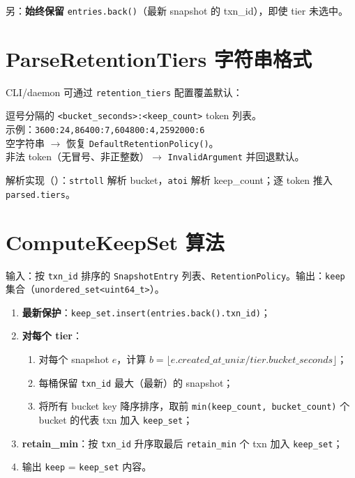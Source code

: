另：\textbf{始终保留} \texttt{entries.back()}（最新 snapshot 的 txn\_id），即使 tier 未选中。

\section{ParseRetentionTiers 字符串格式}

CLI/daemon 可通过 \texttt{retention\_tiers} 配置覆盖默认：

\begin{designbox}[语法]
逗号分隔的 \texttt{<bucket\_seconds>:<keep\_count>} token 列表。\\
示例：\texttt{3600:24,86400:7,604800:4,2592000:6}\\
空字符串 $\rightarrow$ 恢复 \texttt{DefaultRetentionPolicy()}。\\
非法 token（无冒号、非正整数）$\rightarrow$ \texttt{InvalidArgument} 并回退默认。
\end{designbox}

解析实现（）：\texttt{strtoll} 解析 bucket，\texttt{atoi} 解析 keep\_count；逐 token 推入 \texttt{parsed.tiers}。

\section{ComputeKeepSet 算法}

输入：按 \texttt{txn\_id} 排序的 \texttt{SnapshotEntry} 列表、\texttt{RetentionPolicy}。输出：\texttt{keep} 集合（\texttt{unordered\_set<uint64\_t>}）。

\begin{enumerate}
  \item \textbf{最新保护}：\texttt{keep\_set.insert(entries.back().txn\_id)}；
  \item \textbf{对每个 tier}：
  \begin{enumerate}[nosep]
    \item 对每个 snapshot $e$，计算 $b = \lfloor e.created\_at\_unix / tier.bucket\_seconds \rfloor$；
    \item 每桶保留 \texttt{txn\_id} 最大（最新）的 snapshot；
    \item 将所有 bucket key 降序排序，取前 \texttt{min(keep\_count, bucket\_count)} 个 bucket 的代表 txn 加入 \texttt{keep\_set}；
  \end{enumerate}
  \item \textbf{retain\_min}：按 \texttt{txn\_id} 升序取最后 \texttt{retain\_min} 个 txn 加入 \texttt{keep\_set}；
  \item 输出 \texttt{keep} = \texttt{keep\_set} 内容。
\end{enumerate}

